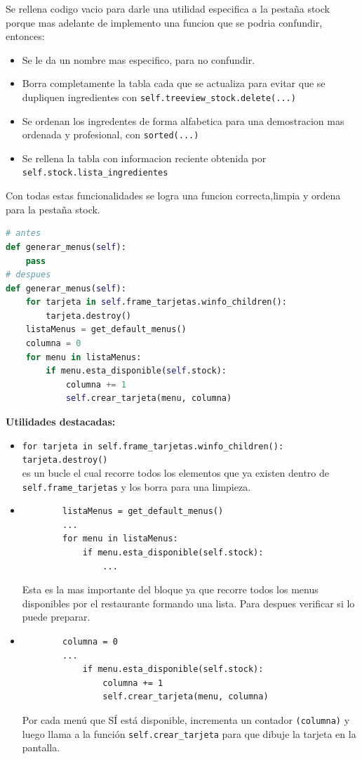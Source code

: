 \documentclass[a4paper,12pt]{article}
\begin{document}
Se rellena codigo vacio para darle una utilidad especifica a la pestaña stock porque mas adelante de implemento una funcion que se podria confundir, entonces:

\begin{itemize}
    \item Se le da un nombre mas especifico, para no confundir.
    \item Borra completamente la tabla cada que se actualiza para evitar que se dupliquen ingredientes con \verb|self.treeview_stock.delete(...)|
    \item Se ordenan los ingredentes de forma alfabetica para una demostracion mas ordenada y profesional, con \verb|sorted(...)|
    \item Se rellena la tabla con informacion reciente obtenida por\\ \verb|self.stock.lista_ingredientes|
\end{itemize}
Con todas estas funcionalidades se logra una funcion correcta,limpia y ordena para la pestaña stock.
\newpage
\begin{lstlisting}[language=Python, caption={Implementaciones de codigo}, frame=single]
# antes
def generar_menus(self):
    pass
# despues
def generar_menus(self):
    for tarjeta in self.frame_tarjetas.winfo_children():
        tarjeta.destroy()
    listaMenus = get_default_menus()
    columna = 0
    for menu in listaMenus:
        if menu.esta_disponible(self.stock):
            columna += 1
            self.crear_tarjeta(menu, columna)
\end{lstlisting}
\textbf{Utilidades destacadas:}
\begin{itemize}
    \item \verb|for tarjeta in self.frame_tarjetas.winfo_children(): tarjeta.destroy()|\\es un bucle el cual recorre todos los elementos que ya existen dentro de\\ \verb|self.frame_tarjetas| y los borra para una limpieza.
    \item \begin{lstlisting}
        listaMenus = get_default_menus()
        ...
        for menu in listaMenus:
            if menu.esta_disponible(self.stock):
                ...
    \end{lstlisting}
    Esta es la mas importante del bloque ya que recorre todos los menus disponibles por el restaurante formando una lista. Para despues verificar si lo puede preparar.
    \item \begin{lstlisting}
        columna = 0
        ...
            if menu.esta_disponible(self.stock):
                columna += 1
                self.crear_tarjeta(menu, columna)
    \end{lstlisting}
    Por cada menú que SÍ está disponible, incrementa un contador \verb|(columna)| y luego llama a la función \verb|self.crear_tarjeta| para que dibuje la tarjeta en la pantalla.
\end{itemize}
\end{document}

